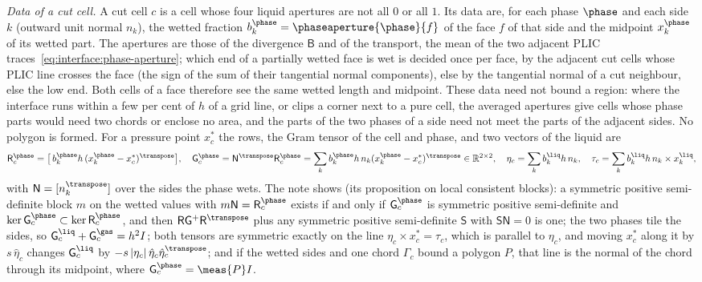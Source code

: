 \emph{Data of a cut cell.} A cut cell $c$ is a cell whose four liquid
apertures are not all $0$ or all $1$. Its data are, for each phase $\phase$
and each side $k$ (outward unit normal $n_k$), the wetted fraction
$b^{\phase}_k=\phaseaperture{\phase}{f}$ of the face $f$ of that side and the
midpoint $x^{\phase}_k$ of its wetted part. The apertures are those of the
divergence $\mathsf B$ and of the transport, the mean of the two adjacent PLIC
traces~\cref{eq:interface:phase-aperture}; which end of a partially wetted face
is wet is decided once per face, by the adjacent cut cells whose PLIC line
crosses the face (the sign of the sum of their tangential normal components),
else by the tangential normal of a cut neighbour, else the low end. Both cells
of a face therefore see the same wetted length and midpoint. These data need
not bound a region: where the interface runs within a few per cent of $h$ of
a grid line, or clips a corner next to a pure cell, the averaged apertures give
cells whose phase parts would need two chords or enclose no area, and the
parts of the two phases of a side need not meet the parts of the adjacent
sides. No polygon is formed. For a pressure point $x^{*}_c$ the rows, the
Gram tensor of the cell and phase, and two vectors of the liquid are
\begin{equation}\label{eq:projection:mimetic-gram}
  \mathsf R^{\phase}_c=\bigl[\,b^{\phase}_kh\,(x^{\phase}_k-x^{*}_c)^{\transpose}\bigr],\quad
  \mathsf G^{\phase}_c=\mathsf N^{\transpose}\mathsf R^{\phase}_c=\sum_kb^{\phase}_kh\,n_k(x^{\phase}_k-x^{*}_c)^{\transpose}\in\mathbb R^{2\times2},\quad
  \eta_c=\sum_kb^{\liq}_kh\,n_k,\quad
  \tau_c=\sum_kb^{\liq}_kh\,n_k\times x^{\liq}_k,
\end{equation}
with $\mathsf N=[n_k^{\transpose}]$ over the sides the phase wets. The note
shows (its proposition on local consistent blocks): a symmetric positive
semi-definite block $m$ on the wetted values with $m\mathsf N=\mathsf R^{\phase}_c$
exists if and only if $\mathsf G^{\phase}_c$ is symmetric positive semi-definite
and $\ker\mathsf G^{\phase}_c\subset\ker\mathsf R^{\phase}_c$, and then
$\mathsf R\mathsf G^{+}\mathsf R^{\transpose}$ plus any symmetric positive
semi-definite $\mathsf S$ with $\mathsf S\mathsf N=0$ is one; the two phases tile
the sides, so $\mathsf G^{\liq}_c+\mathsf G^{\gas}_c=h^2I$; both tensors are
symmetric exactly on the line $\eta_c\times x^{*}_c=\tau_c$, which is parallel
to $\eta_c$, and moving $x^{*}_c$ along it by $s\,\hat\eta_c$ changes
$\mathsf G^{\liq}_c$ by $-s\abs{\eta_c}\hat\eta_c\hat\eta_c^{\transpose}$; and if the
wetted sides and one chord $\Gamma_c$ bound a polygon $P$, that line is the
normal of the chord through its midpoint, where $\mathsf G^{\phase}_c=\meas{P}I$.

